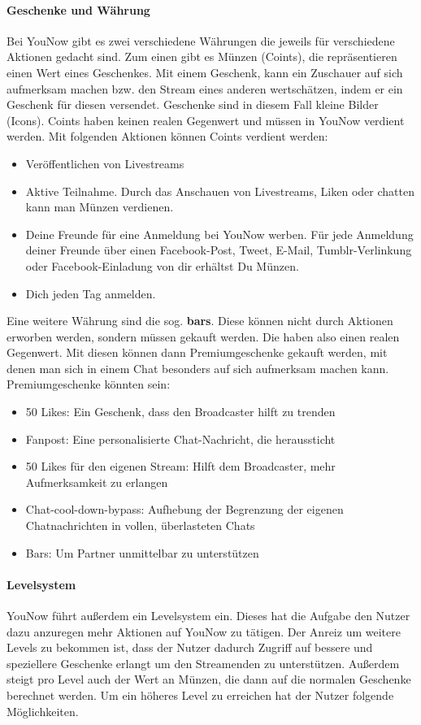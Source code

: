 \paragraph{Geschenke und Währung}
Bei YouNow gibt es zwei verschiedene Währungen die jeweils für verschiedene Aktionen gedacht sind. Zum einen gibt es Münzen (Coints), die repräsentieren einen Wert eines Geschenkes. Mit einem Geschenk, kann ein Zuschauer auf sich aufmerksam machen bzw. den Stream eines anderen wertschätzen, indem er ein Geschenk für diesen versendet. Geschenke sind in diesem Fall kleine Bilder (Icons).
Coints haben keinen realen Gegenwert und müssen in YouNow verdient werden. Mit folgenden Aktionen können Coints verdient werden:

\begin{itemize}
	\item Veröffentlichen von Livestreams
	\item Aktive Teilnahme. Durch das Anschauen von Livestreams, Liken oder chatten kann man Münzen verdienen.
	\item Deine Freunde für eine Anmeldung bei YouNow werben. Für jede Anmeldung deiner Freunde über einen Facebook-Post, Tweet, E-Mail, Tumblr-Verlinkung oder Facebook-Einladung von dir erhältst Du Münzen. 
	\item Dich jeden Tag anmelden.
\end{itemize} 

Eine weitere Währung sind die sog. \textbf{bars}. Diese können nicht durch Aktionen erworben werden, sondern müssen gekauft werden. Die haben also einen realen Gegenwert. Mit diesen können dann Premiumgeschenke gekauft werden, mit denen man sich in einem Chat besonders auf sich aufmerksam machen kann. Premiumgeschenke könnten sein:

\begin{itemize}
	\item 50 Likes: Ein Geschenk, dass den Broadcaster hilft zu trenden
	\item Fanpost: Eine personalisierte Chat-Nachricht, die heraussticht 
	\item 50 Likes für den eigenen Stream: Hilft dem Broadcaster, mehr Aufmerksamkeit zu erlangen
	\item Chat-cool-down-bypass: Aufhebung der Begrenzung der eigenen Chatnachrichten in vollen, überlasteten Chats
	\item Bars: Um Partner unmittelbar zu unterstützen
\end{itemize}

\paragraph{Levelsystem}
YouNow führt außerdem ein Levelsystem ein. Dieses hat die Aufgabe den Nutzer dazu anzuregen mehr Aktionen auf YouNow zu tätigen. Der Anreiz um weitere Levels zu bekommen ist, dass der Nutzer dadurch Zugriff auf bessere und speziellere Geschenke erlangt um den Streamenden zu unterstützen. Außerdem steigt pro Level auch der Wert an Münzen, die dann auf die normalen Geschenke berechnet werden. 
Um ein höheres Level zu erreichen hat der Nutzer folgende Möglichkeiten.

